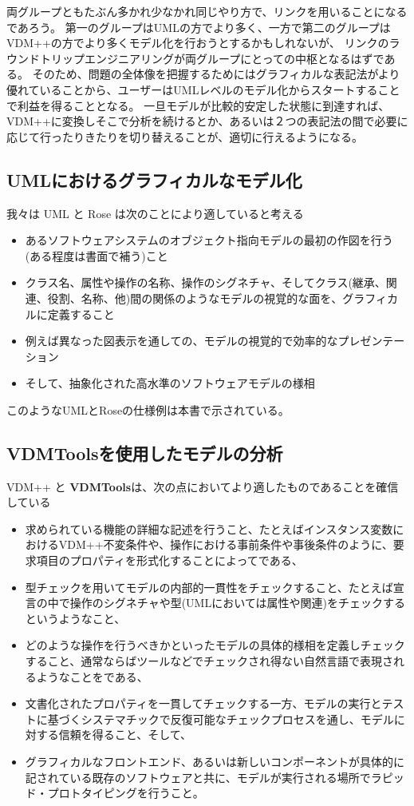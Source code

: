 \documentclass[\pformat,12pt,twoside]{jarticle}
\newcommand{\vdmtools}{\textbf{VDMTools}}
\begin{document}
両グループともたぶん多かれ少なかれ同じやり方で、リンクを用いることになるであろう。
第一のグループはUMLの方でより多く、一方で第二のグループはVDM++の方でより多くモデル化を行おうとするかもしれないが、 リンクのラウンドトリップエンジニアリングが両グループにとっての中枢となるはずである。
そのため、問題の全体像を把握するためにはグラフィカルな表記法がより優れていることから、ユーザーはUMLレベルのモデル化からスタートすることで利益を得ることとなる。 
一旦モデルが比較的安定した状態に到達すれば、VDM++に変換しそこで分析を続けるとか、あるいは２つの表記法の間で必要に応じて行ったりきたりを切り替えることが、適切に行えるようになる。

\subsection{UMLにおけるグラフィカルなモデル化}

我々は UML と Rose は次のことにより適していると考える
\begin{itemize}
\item
あるソフトウェアシステムのオブジェクト指向モデルの最初の作図を行う(ある程度は書面で補う)こと
\item
クラス名、属性や操作の名称、操作のシグネチャ、そしてクラス(継承、関連、役割、名称、他)間の関係のようなモデルの視覚的な面を、グラフィカルに定義すること
\item
例えば異なった図表示を通しての、モデルの視覚的で効率的なプレゼンテーション
\item
そして、抽象化された高水準のソフトウェアモデルの様相
\end{itemize}


このようなUMLとRoseの仕様例は本書で示されている。

\subsection{\vdmtools を使用したモデルの分析}

VDM++ と \vdmtools は、次の点においてより適したものであることを確信している

\begin{itemize}
\item
求められている機能の詳細な記述を行うこと、たとえばインスタンス変数におけるVDM++不変条件や、操作における事前条件や事後条件のように、要求項目のプロパティを形式化することによってである、 
\item
型チェックを用いてモデルの内部的一貫性をチェックすること、たとえば宣言の中で操作のシグネチャや型(UMLにおいては属性や関連)をチェックするというようなこと、
\item
どのような操作を行うべきかといったモデルの具体的様相を定義しチェックすること、通常ならばツールなどでチェックされ得ない自然言語で表現されるようなことをである、
\item
文書化されたプロパティを一貫してチェックする一方、モデルの実行とテストに基づくシステマチックで反復可能なチェックプロセスを通し、モデルに対する信頼を得ること、そして、
\item
グラフィカルなフロントエンド、あるいは新しいコンポーネントが具体的に記されている既存のソフトウェアと共に、モデルが実行される場所でラピッド・プロトタイピングを行うこと。
\end{itemize}
\end{document}

